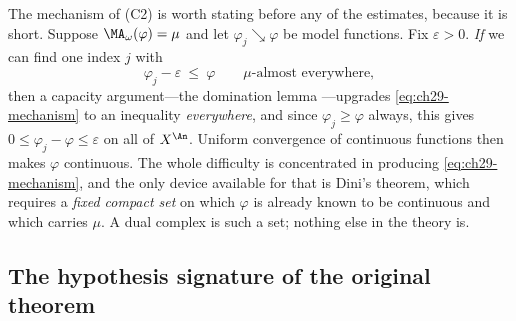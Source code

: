 The mechanism of (C2) is worth stating before any of the estimates, because
it is short.  Suppose \(\MA_\omega(\varphi)=\mu\) and let
\(\varphi_j\searrow\varphi\) be model functions.  Fix \(\varepsilon>0\).
\emph{If} we can find one index \(j\) with
\begin{equation}
\label{eq:ch29-mechanism}
 \varphi_j-\varepsilon\ \leq\ \varphi
 \qquad\mu\text{-almost everywhere},
\end{equation}
then a capacity argument---the domination lemma
---upgrades
\eqref{eq:ch29-mechanism} to an inequality \emph{everywhere}, and since
\(\varphi_j\geq\varphi\) always, this gives
\(0\leq\varphi_j-\varphi\leq\varepsilon\) on all of \(X^{\An}\).  Uniform
convergence of continuous functions then makes \(\varphi\) continuous.  The
whole difficulty is concentrated in producing \eqref{eq:ch29-mechanism}, and
the only device available for that is Dini's theorem, which requires a
\emph{fixed compact set} on which \(\varphi\) is already known to be
continuous and which carries \(\mu\).  A dual complex is such a set; nothing
else in the theory is.

\subsection{The hypothesis signature of the original theorem}
\label{sec:ch29-signature}

